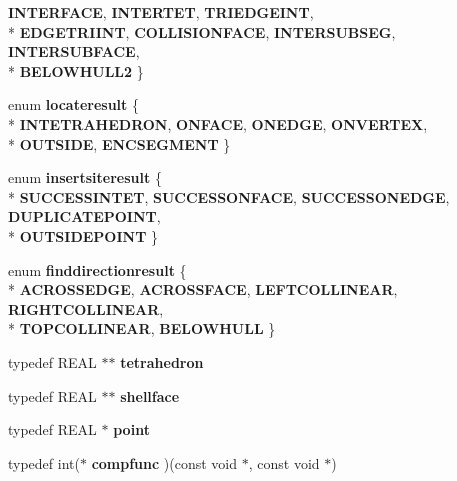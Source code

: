 \begin{DoxyCompactItemize}
{\bfseries I\-N\-T\-E\-R\-F\-A\-C\-E}, 
{\bfseries I\-N\-T\-E\-R\-T\-E\-T}, 
{\bfseries T\-R\-I\-E\-D\-G\-E\-I\-N\-T}, 
\\*
{\bfseries E\-D\-G\-E\-T\-R\-I\-I\-N\-T}, 
{\bfseries C\-O\-L\-L\-I\-S\-I\-O\-N\-F\-A\-C\-E}, 
{\bfseries I\-N\-T\-E\-R\-S\-U\-B\-S\-E\-G}, 
{\bfseries I\-N\-T\-E\-R\-S\-U\-B\-F\-A\-C\-E}, 
\\*
{\bfseries B\-E\-L\-O\-W\-H\-U\-L\-L2}
 \}
\item 
enum {\bfseries locateresult} \{ \\*
{\bfseries I\-N\-T\-E\-T\-R\-A\-H\-E\-D\-R\-O\-N}, 
{\bfseries O\-N\-F\-A\-C\-E}, 
{\bfseries O\-N\-E\-D\-G\-E}, 
{\bfseries O\-N\-V\-E\-R\-T\-E\-X}, 
\\*
{\bfseries O\-U\-T\-S\-I\-D\-E}, 
{\bfseries E\-N\-C\-S\-E\-G\-M\-E\-N\-T}
 \}
\item 
enum {\bfseries insertsiteresult} \{ \\*
{\bfseries S\-U\-C\-C\-E\-S\-S\-I\-N\-T\-E\-T}, 
{\bfseries S\-U\-C\-C\-E\-S\-S\-O\-N\-F\-A\-C\-E}, 
{\bfseries S\-U\-C\-C\-E\-S\-S\-O\-N\-E\-D\-G\-E}, 
{\bfseries D\-U\-P\-L\-I\-C\-A\-T\-E\-P\-O\-I\-N\-T}, 
\\*
{\bfseries O\-U\-T\-S\-I\-D\-E\-P\-O\-I\-N\-T}
 \}
\item 
enum {\bfseries finddirectionresult} \{ \\*
{\bfseries A\-C\-R\-O\-S\-S\-E\-D\-G\-E}, 
{\bfseries A\-C\-R\-O\-S\-S\-F\-A\-C\-E}, 
{\bfseries L\-E\-F\-T\-C\-O\-L\-L\-I\-N\-E\-A\-R}, 
{\bfseries R\-I\-G\-H\-T\-C\-O\-L\-L\-I\-N\-E\-A\-R}, 
\\*
{\bfseries T\-O\-P\-C\-O\-L\-L\-I\-N\-E\-A\-R}, 
{\bfseries B\-E\-L\-O\-W\-H\-U\-L\-L}
 \}
\item 
\hypertarget{classtetgenmesh_a6a12b1c0d1834ca941d16c62e949e5e3}{typedef R\-E\-A\-L $\ast$$\ast$ {\bfseries tetrahedron}}\label{classtetgenmesh_a6a12b1c0d1834ca941d16c62e949e5e3}

\item 
\hypertarget{classtetgenmesh_ad4860123b88783b943fa6452e886a2cb}{typedef R\-E\-A\-L $\ast$$\ast$ {\bfseries shellface}}\label{classtetgenmesh_ad4860123b88783b943fa6452e886a2cb}

\item 
\hypertarget{classtetgenmesh_ace3fb4f80389185b7c9b18ab69a3dea2}{typedef R\-E\-A\-L $\ast$ {\bfseries point}}\label{classtetgenmesh_ace3fb4f80389185b7c9b18ab69a3dea2}

\item 
\hypertarget{classtetgenmesh_abc7049c8e1a3c3e1e8db8eada5f78bde}{typedef int($\ast$ {\bfseries compfunc} )(const void $\ast$, const void $\ast$)}\label{classtetgenmesh_abc7049c8e1a3c3e1e8db8eada5f78bde}

\end{DoxyCompactItemize}
